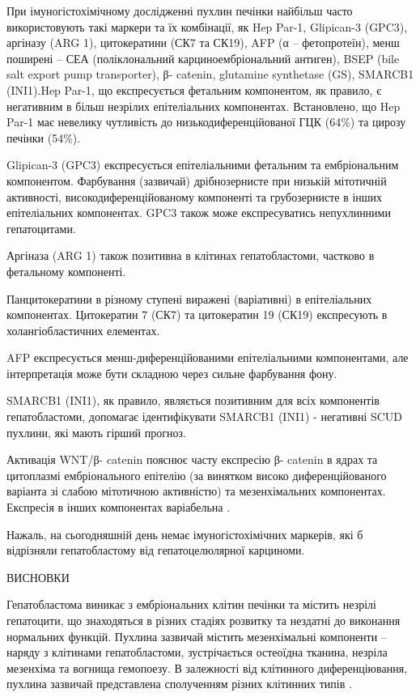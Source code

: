 При  імуногістохімічному  дослідженні пухлин печінки  найбільш часто використовують  такі маркери та їх комбінації,  як  Hep Par-1, Glipican-3 (GPC3), аргіназу  (ARG 1), цитокератини (СК7 та СК19),  AFP (α – фетопротеїн), менш поширені – СЕА (поліклональний карциноембріональний антиген), BSEP (bile salt export pump transporter),  β- catenin, glutamine synthetase (GS), SMARCB1 (INI1).Hep Par-1, що експресується  фетальним компонентом, як правило, є  негативним в більш незрілих епітеліальних компонентах. Встановлено, що Hep Par-1 має невелику чутливість до низькодиференційованої  ГЦК (64\%) та цирозу печінки  (54\%). 

Glipican-3 (GPC3) експресується епітеліальними фетальним та ембріональним компонентом. Фарбування (зазвичай)  дрібнозернисте  при низькій мітотичній активності, високодиференційованому компоненті та грубозернисте в інших епітеліальних компонентах.      GPC3  також може експресуватись непухлинними гепатоцитами. 

Аргіназа (ARG 1) також позитивна в клітинах гепатобластоми, частково в фетальному компоненті.

Панцитокератини в різному ступені виражені (варіативні) в епітеліальних компонентах. Цитокератин 7 (СК7) та цитокератин 19 (СК19) експресують в холангіобластичних елементах.

AFP  експресується  менш-диференційованими епітеліальними компонентами,  але  інтерпретація  може бути складною через сильне фарбування фону.

SMARCB1 (INI1), як правило, являється позитивним для всіх компонентів гепатобластоми, допомагає ідентифікувати  SMARCB1 (INI1) - негативні  SCUD пухлини, які мають гірший прогноз.

Активація  WNT/β- catenin пояснює часту експресію   β- catenin в ядрах та  цитоплазмі ембріонального епітелію (за винятком  високо диференційованого варіанта зі слабою мітотичною активністю) та мезенхімальних  компонентах.  Експресія в інших компонентах варіабельна \cite{pmid18970927}.

Нажаль, на сьогодняшній день  немає імуногістохімічних маркерів, які б відрізняли гепатобластому від гепатоцелюлярної карциноми.

ВИСНОВКИ

Гепатобластома виникає з ембріональних клітин печінки та містить незрілі гепатоцити, що знаходяться в різних стадіях розвитку та нездатні до виконання нормальних функцій. Пухлина зазвичай містить мезенхімальні компоненти – наряду з клітинами гепатобластоми, зустрічається остеоїдна  тканина, незріла мезенхіма та вогнища гемопоезу. В залежності від клітинного диференціювання, пухлина зазвичай представлена сполученням різних клітинних типів \cite{pmid16123986}.

